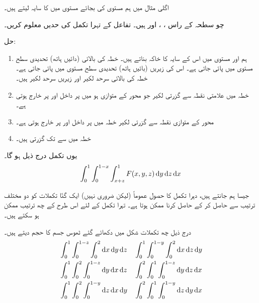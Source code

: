 اگلی مثال میں ہم  مستوی  کی بجائے مستوی  میں  کا سایہ لیتے ہیں۔

چو سطحہ   کے راس ، ،  اور  ہیں۔ تفاعل  کے تہرا تکمل کی حدیں معلوم کریں۔

حل:\quad
\begin{enumerate}[1.]
\item
{}\quad
ہم  اور مستوی  میں اس کے  سایہ  کا خاکہ بناتے ہیں۔ خطہ  کی بالائی (دائیں ہاتھ)  تحدیدی سطح    مستوی  میں پائی جاتی ہے۔ اس کی زیریں (بائیں ہاتھ) تحدیدی سطح مستوی  میں پائی جاتی ہے۔ خطہ  کی بالائی  سرحد لکیر   اور زیریں سرحد لکیر  ہیں۔
\item
{}\quad
خطہ  میں علامتی نقطہ   سے گزرتی لکیر  جو محور  کے متوازی ہو  میں  پر داخل اور  پر خارج ہوتی ہے۔
\item
{}\quad
محور  کے متوازی نقطہ  سے گزرتی لکیر  خطہ   میں  پر داخل اور  پر خارج ہوتی ہے۔
\item
{}\quad
خطہ  میں   سے  تک  گزرتی ہیں۔
\end{enumerate}
یوں تکمل درج ذیل ہو گا۔
\begin{align*}
\int_0^1\int_0^{1-x}\int_{x+z}^1F(x,y,z)\dif y\dif z\dif x
\end{align*}

جیسا ہم جانتے ہیں، دہرا تکمل کا حصول عموماً (لیکن ضروری نہیں)    ایک گنّا تکملات کو دو مختلف  ترتیب سے حاصل کر کے حاصل کرنا ممکن ہوتا ہے۔ تہرا تکمل کے لئے اس طرح کے چھ  ترتیب ممکن ہو سکتے ہیں۔

درج  ذیل چھ تکملات شکل میں دکھائے گئے ٹھوس جسم کا حجم دیتے ہیں۔
\begin{align*}
&\int_0^1\int_0^{1-z}\int_0^2 \dif x\dif y\dif z&&\int_0^1\int_0^{1-y}\int_0^2\dif x\dif z\dif y\\
&\int_0^1\int_0^2\int_0^{1-z}\dif y\dif x\dif z&&\int_0^2\int_0^1\int_0^{1-z}\dif y\dif z\dif x\\
&\int_0^1\int_0^2\int_0^{1-y}\dif z\dif x\dif y&&\int_0^2\int_0^1\int_0^{1-y}\dif z\dif y\dif x
\end{align*}

